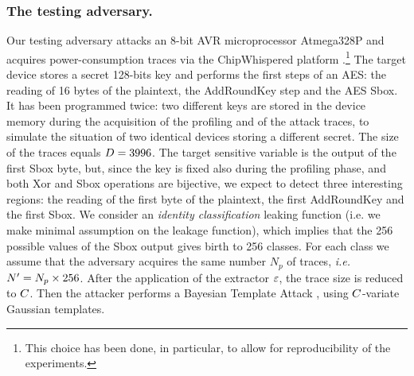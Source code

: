 \subsubsection{The testing adversary.}  Our testing adversary attacks an 8-bit AVR microprocessor Atmega328P and acquires power-consumption traces via the ChipWhispered platform \cite{o2014chipwhisperer}.\footnote{This choice has been done, in particular, to allow for reproducibility of the experiments.} The target device stores a secret 128-bits key and performs the first steps of an AES: the reading of 16 bytes of the plaintext, the AddRoundKey step and the AES Sbox. It has been programmed twice: two different keys are stored in the device memory during the acquisition of the profiling and of the attack traces, to simulate the situation of two identical devices storing a different secret. The size of the traces equals $\traceLength = 3996$. The target sensitive variable is the output of the first Sbox byte, but, since the key is fixed also during the profiling phase, and both Xor and Sbox operations are bijective, we expect to detect three interesting regions: the reading of the first byte of the plaintext, the first AddRoundKey and the first Sbox. We consider an {\em identity classification} leaking function (i.e. we make minimal assumption on the leakage function), which implies that the 256 possible values of the Sbox output gives birth to 256 classes. For each class we assume that the adversary acquires the same number $N_p$ of traces, \textit{i.e.} $\numTraces[]' = N_p\times 256$. After the application of the extractor $\extract$, the trace size is reduced to $\newTraceLength$. Then the attacker performs a Bayesian Template Attack \cite{Chari2003}, using $\newTraceLength$-variate Gaussian templates.
